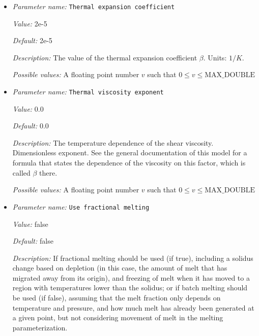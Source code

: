 \begin{itemize}
{\it Possible values:} A floating point number $v$ such that $0 \leq v \leq \text{MAX\_DOUBLE}$
\item {\it Parameter name:} {\tt Thermal expansion coefficient}
\label{parameters:Material model/Melt simple/Thermal expansion coefficient}


{\it Value:} 2e-5


{\it Default:} 2e-5


{\it Description:} The value of the thermal expansion coefficient $\beta$. Units: $1/K$.


{\it Possible values:} A floating point number $v$ such that $0 \leq v \leq \text{MAX\_DOUBLE}$
\item {\it Parameter name:} {\tt Thermal viscosity exponent}
\label{parameters:Material model/Melt simple/Thermal viscosity exponent}


{\it Value:} 0.0


{\it Default:} 0.0


{\it Description:} The temperature dependence of the shear viscosity. Dimensionless exponent. See the general documentation of this model for a formula that states the dependence of the viscosity on this factor, which is called $\beta$ there.


{\it Possible values:} A floating point number $v$ such that $0 \leq v \leq \text{MAX\_DOUBLE}$
\item {\it Parameter name:} {\tt Use fractional melting}
\label{parameters:Material model/Melt simple/Use fractional melting}


{\it Value:} false


{\it Default:} false


{\it Description:} If fractional melting should be used (if true), including a solidus change based on depletion (in this case, the amount of melt that has migrated away from its origin), and freezing of melt when it has moved to a region with temperatures lower than the solidus; or if batch melting should be used (if false), assuming that the melt fraction only depends on temperature and pressure, and how much melt has already been generated at a given point, but not considering movement of melt in the melting parameterization.



\end{itemize}
